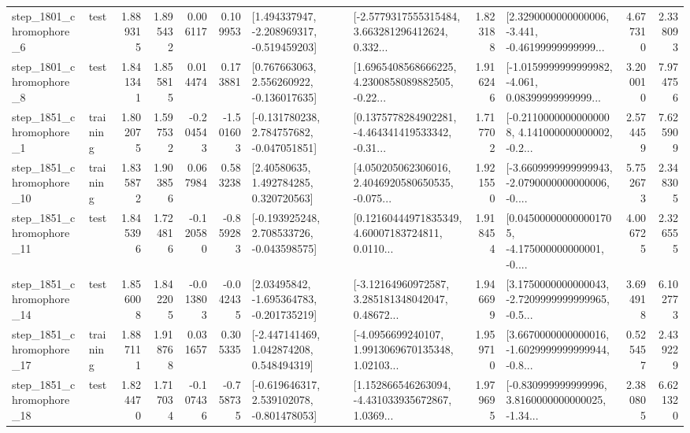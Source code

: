 \begin{tabular}{llrrrrllrlrr}
  step\_1801\_chromophore\_6 &      test &      1.889315 &    1.895432 &      0.006117 &  0.109953 &   [1.494337947, -2.208969317, -0.519459203] &  [-2.5779317555315484, 3.663281296412624, 0.332... &       1.823188 &  [2.3290000000000006, -3.441, -0.46199999999999... &            4.677310 &          2.338093 \\
  step\_1801\_chromophore\_8 &      test &      1.841341 &    1.855815 &      0.014474 &  0.173881 &    [0.767663063, 2.556260922, -0.136017635] &  [1.6965408568666225, 4.2300858089882505, -0.22... &       1.916246 &  [-1.0159999999999982, -4.061, 0.08399999999999... &            3.200010 &          7.974756 \\
  step\_1851\_chromophore\_1 &  training &      1.802075 &    1.597532 &     -0.204543 & -1.501603 &   [-0.131780238, 2.784757682, -0.047051851] &  [0.1375778284902281, -4.464341419533342, -0.31... &       1.717702 &  [-0.21100000000000008, 4.141000000000002, -0.2... &            2.574459 &          7.625909 \\
 step\_1851\_chromophore\_10 &  training &      1.835872 &    1.903856 &      0.067984 &  0.583238 &      [2.40580635, 1.492784285, 0.320720563] &  [4.050205062306016, 2.4046920580650535, -0.075... &       1.921550 &  [-3.6609999999999943, -2.0790000000000006, -0.... &            5.752673 &          2.348305 \\
 step\_1851\_chromophore\_11 &      test &      1.845396 &    1.724816 &     -0.120580 & -0.859283 &   [-0.193925248, 2.708533726, -0.043598575] &  [0.12160444971835349, 4.60007183724811, 0.0110... &       1.918454 &  [0.045000000000001705, -4.175000000000001, -0.... &            4.006725 &          2.326555 \\
 step\_1851\_chromophore\_14 &      test &      1.856008 &    1.842205 &     -0.013803 & -0.042435 &    [2.03495842, -1.695364783, -0.201735219] &  [-3.12164960972587, 3.285181348042047, 0.48672... &       1.946699 &  [3.1750000000000043, -2.7209999999999965, -0.5... &            3.694918 &          6.102773 \\
 step\_1851\_chromophore\_17 &  training &      1.887111 &    1.918768 &      0.031657 &  0.305335 &    [-2.447141469, 1.042874208, 0.548494319] &  [-4.0956699240107, 1.9913069670135348, 1.02103... &       1.959710 &  [3.6670000000000016, -1.6029999999999944, -0.8... &            0.525457 &          2.439229 \\
 step\_1851\_chromophore\_18 &      test &      1.824470 &    1.717034 &     -0.107436 & -0.758735 &   [-0.619646317, 2.539102078, -0.801478053] &  [1.152866546263094, -4.431033935672867, 1.0369... &       1.979695 &  [-0.830999999999996, 3.8160000000000025, -1.34... &            2.380805 &          6.621320 \\

\end{tabular}
